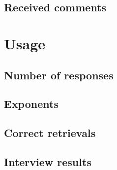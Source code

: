 \subsection{Received comments}

\section{Usage}

\subsection{Number of responses}

\subsection{Exponents}

\subsection{Correct retrievals}

\subsection{Interview results}
